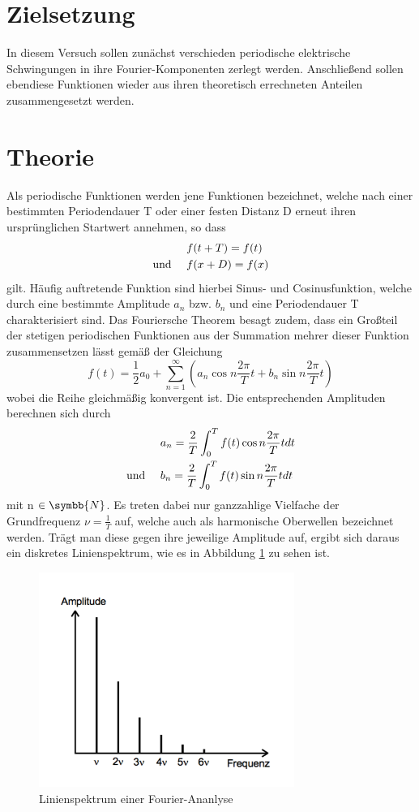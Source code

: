 
\section{Zielsetzung}
In diesem Versuch sollen zunächst verschieden periodische elektrische
Schwingungen in ihre Fourier-Komponenten zerlegt werden. Anschließend sollen
ebendiese Funktionen wieder aus ihren theoretisch errechneten Anteilen
zusammengesetzt werden.

\section{Theorie}
Als periodische Funktionen werden jene Funktionen bezeichnet, welche nach
einer bestimmten Periodendauer T oder einer festen Distanz D erneut ihren
ursprünglichen Startwert annehmen, so dass
\begin{align}
  & f(t+T)=f(t) \\
  \text{und \quad}      & f(x+D)=f(x)
  \label{eqn:period}
\end{align}
gilt. Häufig auftretende Funktion sind hierbei Sinus- und Cosinusfunktion,
welche durch eine bestimmte Amplitude $a_n$ bzw. $b_n$ und eine Periodendauer T
charakterisiert sind.
Das Fouriersche Theorem besagt zudem, dass ein Großteil der stetigen periodischen
Funktionen aus der Summation mehrer dieser Funktion zusammensetzen lässt gemäß
der Gleichung
\begin{equation}
   f(t)= \frac{1}{2}a_0 + \sum_{n=1}^\infty \left(a_n \cos n \frac{2 \pi}{T}t
   + b_n \sin n \frac{2 \pi}{T}t\right)
\end{equation}
wobei die Reihe gleichmäßig konvergent ist. Die entsprechenden Amplituden
berechnen sich durch
\begin{align}
  & a_n = \frac{2}{T} \int_0^T f(t) \cos n \frac{2 \pi}{T}t dt \\
  \text{und \quad}     & b_n = \frac{2}{T} \int_0^T f(t) \sin n \frac{2 \pi}
  {T}t dt
\end{align}
mit n $\in \symbb{N} $. Es treten dabei nur ganzzahlige Vielfache der
Grundfrequenz $\nu = \frac{1}{T} $ auf, welche auch als harmonische Oberwellen
bezeichnet werden. Trägt man diese gegen ihre jeweilige Amplitude auf, ergibt
sich daraus ein diskretes Linienspektrum, wie es in Abbildung
\ref{fig:spektrum} zu sehen ist.
\begin{figure}[H]
  \centering
  \includegraphics[height=7cm]{Spektrum.png}
  \caption{Linienspektrum einer Fourier-Ananlyse \cite{skript}}
  \label{fig:spektrum}
\end{figure}

